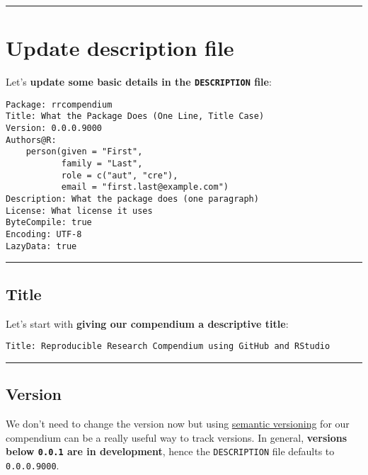 \documentclass[
  letterpaper,
  DIV=11,
  numbers=noendperiod]{scrreprt}
\begin{document}
\begin{center}\rule{0.5\linewidth}{0.5pt}\end{center}

\hypertarget{update-description-file}{%
\section{Update description file}\label{update-description-file}}

Let's \textbf{update some basic details in the \texttt{DESCRIPTION}
file}:

\begin{verbatim}
Package: rrcompendium
Title: What the Package Does (One Line, Title Case)
Version: 0.0.0.9000
Authors@R: 
    person(given = "First",
           family = "Last",
           role = c("aut", "cre"),
           email = "first.last@example.com")
Description: What the package does (one paragraph)
License: What license it uses
ByteCompile: true
Encoding: UTF-8
LazyData: true
\end{verbatim}

\begin{center}\rule{0.5\linewidth}{0.5pt}\end{center}

\hypertarget{title}{%
\subsection{Title}\label{title}}

Let's start with \textbf{giving our compendium a descriptive title}:

\begin{verbatim}
Title: Reproducible Research Compendium using GitHub and RStudio
\end{verbatim}

\begin{center}\rule{0.5\linewidth}{0.5pt}\end{center}

\hypertarget{version}{%
\subsection{Version}\label{version}}

We don't need to change the version now but using
\href{https://semver.org/}{semantic versioning} for our compendium can
be a really useful way to track versions. In general, \textbf{versions
below \texttt{0.0.1} are in development}, hence the \texttt{DESCRIPTION}
file defaults to \texttt{0.0.0.9000}.
\end{document}
